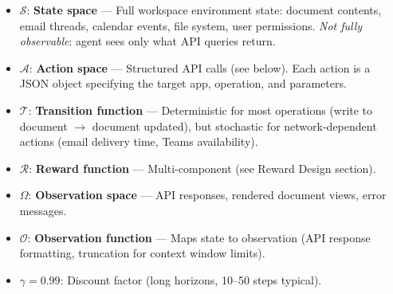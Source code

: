 \begin{itemize}
  \item $\mathcal{S}$: \textbf{State space} --- Full workspace environment state: document contents, email threads, calendar events, file system, user permissions. \emph{Not fully observable}: agent sees only what API queries return.
  \item $\mathcal{A}$: \textbf{Action space} --- Structured API calls (see below). Each action is a JSON object specifying the target app, operation, and parameters.
  \item $\mathcal{T}$: \textbf{Transition function} --- Deterministic for most operations (write to document $\rightarrow$ document updated), but stochastic for network-dependent actions (email delivery time, Teams availability).
  \item $\mathcal{R}$: \textbf{Reward function} --- Multi-component (see Reward Design section).
  \item $\Omega$: \textbf{Observation space} --- API responses, rendered document views, error messages.
  \item $\mathcal{O}$: \textbf{Observation function} --- Maps state to observation (API response formatting, truncation for context window limits).
  \item $\gamma = 0.99$: Discount factor (long horizons, 10--50 steps typical).
\end{itemize}

